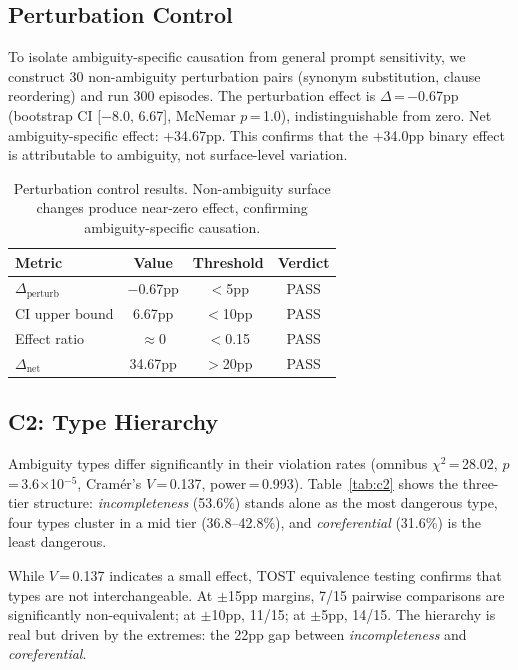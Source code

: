 \documentclass[11pt,a4paper]{article}
\begin{document}
\subsection{Perturbation Control}
\label{sec:perturbation}

To isolate ambiguity-specific causation from general prompt sensitivity, we construct 30 non-ambiguity perturbation pairs (synonym substitution, clause reordering) and run 300 episodes.
The perturbation effect is $\Delta$\,=\,$-$0.67pp (bootstrap CI [$-$8.0, 6.67], McNemar $p$\,=\,1.0), indistinguishable from zero.
Net ambiguity-specific effect: +34.67pp.
This confirms that the +34.0pp binary effect is attributable to ambiguity, not surface-level variation.

\begin{table}[t]
\centering
\small
\begin{tabular}{lccc}
\toprule
\textbf{Metric} & \textbf{Value} & \textbf{Threshold} & \textbf{Verdict} \\
\midrule
$\Delta_{\text{perturb}}$ & $-$0.67pp & $<$5pp & PASS \\
CI upper bound & 6.67pp & $<$10pp & PASS \\
Effect ratio & $\approx$0 & $<$0.15 & PASS \\
$\Delta_{\text{net}}$ & 34.67pp & $>$20pp & PASS \\
\bottomrule
\end{tabular}
\caption{Perturbation control results. Non-ambiguity surface changes produce near-zero effect, confirming ambiguity-specific causation.}
\label{tab:perturbation}
\end{table}

\subsection{C2: Type Hierarchy}
\label{sec:c2}

Ambiguity types differ significantly in their violation rates (omnibus $\chi^2$\,=\,28.02, $p$\,=\,3.6$\times$10$^{-5}$, Cram\'er's $V$\,=\,0.137, power\,=\,0.993).
Table~\ref{tab:c2} shows the three-tier structure: \emph{incompleteness} (53.6\%) stands alone as the most dangerous type, four types cluster in a mid tier (36.8--42.8\%), and \emph{coreferential} (31.6\%) is the least dangerous.

While $V$\,=\,0.137 indicates a small effect, TOST equivalence testing confirms that types are not interchangeable.
At $\pm$15pp margins, 7/15 pairwise comparisons are significantly non-equivalent; at $\pm$10pp, 11/15; at $\pm$5pp, 14/15.
The hierarchy is real but driven by the extremes: the 22pp gap between \emph{incompleteness} and \emph{coreferential}.
\end{document}
